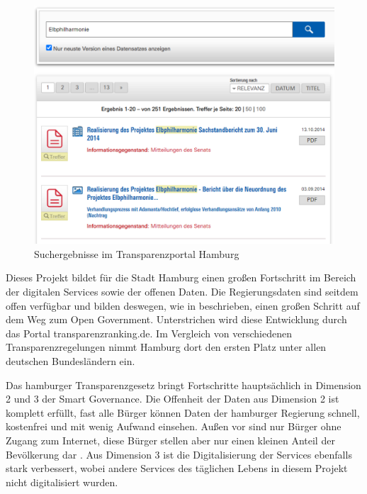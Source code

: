 \begin{figure}
	\includegraphics[width=\textwidth]{graphics/3-transparenzportal}
	\caption[Suchergebnisse im Transparenzportal Hamburg]{Suchergebnisse im Transparenzportal Hamburg}
	\label{fig:3_transparenzportal}
\end{figure}

Dieses Projekt bildet für die Stadt Hamburg einen großen Fortschritt im Bereich der digitalen Services sowie der offenen Daten. Die Regierungsdaten sind seitdem offen verfügbar und bilden deswegen, wie in \citeauthor[15]{Fuetterer.2020} beschrieben, einen großen Schritt auf dem Weg zum Open Government. Unterstrichen wird diese Entwicklung durch das Portal transparenzranking.de. Im Vergleich von verschiedenen Transparenzregelungen nimmt Hamburg dort den ersten Platz unter allen deutschen Bundesländern ein.

Das hamburger Transparenzgesetz bringt Fortschritte hauptsächlich in Dimension 2 und 3 der Smart Governance. Die Offenheit der Daten aus Dimension 2 ist komplett erfüllt, fast alle Bürger können Daten der hamburger Regierung schnell, kostenfrei und mit wenig Aufwand einsehen. Außen vor sind nur Bürger ohne Zugang zum Internet, diese Bürger stellen aber nur einen kleinen Anteil der Bevölkerung dar \autocite[10]{Fuetterer.2020}. Aus Dimension 3 ist die Digitalisierung der Services ebenfalls stark verbessert, wobei andere Services des täglichen Lebens in diesem Projekt nicht digitalisiert wurden.





